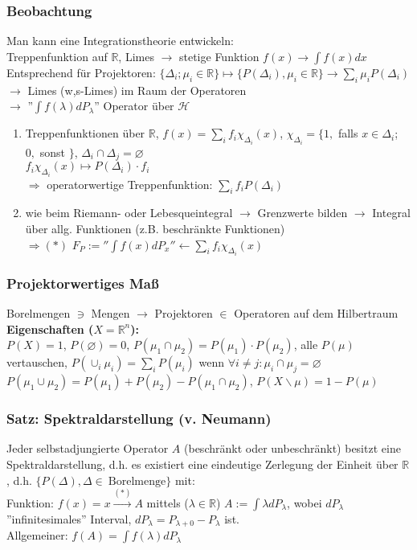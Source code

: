 \documentclass[twoside,a4paper]{scrartcl}
\newcommand{\R}{\mathbb{R}}
\renewcommand{\1}{\mathds{1}}
\newcommand{\Ra}{\Rightarrow}
\newcommand{\ra}{\rightarrow}
\newcommand{\la}{\leftarrow}
\renewcommand{\H}{\mathcal{H}}
\renewcommand{\R}{\mathbb{R}}
\begin{document}
\subsubsection*{Beobachtung}
Man kann eine Integrationstheorie entwickeln:\\
Treppenfunktion auf $\R$, Limes $\ra$ stetige Funktion $f(x) \ra \int f(x)dx$\\
Entsprechend für Projektoren: $\{\Delta_i; \mu_i \in \R\} \mapsto \{P(\Delta_i), \mu_i \in \R \} \ra \sum_i \mu_i P(\Delta_i)$\\
$\ra$ Limes (w,s-Limes) im Raum der Operatoren\\
$\ra$ ''$\int f(\lambda)dP_\lambda$'' Operator über $\H$\\
\begin{enumerate}
\item Treppenfunktionen über $\R$, $f(x)=\sum_i f_i\chi_{\Delta_i}(x)$, $\chi_{\Delta_i}=\{1, $ falls  $x\in \Delta_i$; $0,$ sonst $\}$, $\Delta_i \cap \Delta_j=\varnothing$\\
$f_i\chi_{\Delta_i}(x) \mapsto P(\Delta_i)\cdot f_i$\\
$\Ra$ operatorwertige Treppenfunktion: $\sum_i f_i P(\Delta_i)$
\item wie beim Riemann- oder Lebesqueintegral $\ra$ Grenzwerte bilden $\ra$ Integral über allg. Funktionen (z.B. beschränkte Funktionen)\\
$\Ra (*)$ $F_P:=''\int f(x)dP_x'' \la \sum_i f_i \chi_{\Delta_i}(x)$ 
\end{enumerate}

\subsubsection*{Projektorwertiges Maß}
Borelmengen $\ni$ Mengen $\ra$ Projektoren $\in$ Operatoren auf dem Hilbertraum\\
\textbf{Eigenschaften ($X=\R^n$):}\\
$P(X)=1$, $P(\varnothing)=0$, $P(\mu_1 \cap \mu_2)=P(\mu_1)\cdot P(\mu_2)$, alle $P(\mu)$ vertauschen, $P(\cup_i \mu_i)=\sum_i P(\mu_i)$ wenn $\forall i\neq j: \mu_i \cap \mu_j=\varnothing$\\
$P(\mu_1 \cup \mu_2)=P(\mu_1)+ P(\mu_2)-P(\mu_1 \cap \mu_2)$, $P(X\backslash \mu)=1-P(\mu)$


\subsubsection*{Satz: Spektraldarstellung (v. Neumann)}
Jeder selbstadjungierte Operator $A$ (beschränkt oder unbeschränkt) besitzt eine Spektraldarstellung, d.h. es existiert eine eindeutige Zerlegung der Einheit über $\R$, d.h. $\{P(\Delta), \Delta \in \ \mathrm{Borelmenge}\}$ mit:\\
Funktion: $f(x)=x \stackrel{(*)}{\ra} A$ mittels ($\lambda \in \R$) $A:=\int \lambda dP_\lambda$, wobei $dP_\lambda$ ''infinitesimales'' Interval, $dP_\lambda=P_{\lambda+0}-P_{\lambda}$ ist.\\
Allgemeiner: $f(A)=\int f(\lambda) dP_\lambda$
\end{document}
